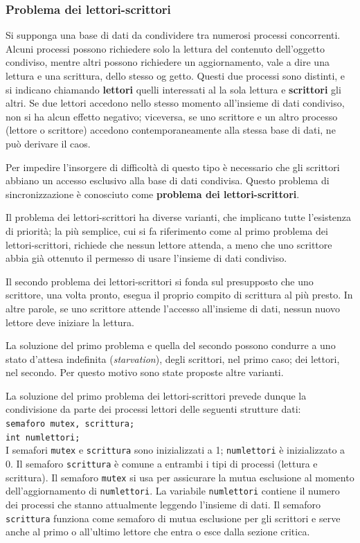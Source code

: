 \documentclass[11pt,a4paper]{article}
\begin{document}
\subsubsection{Problema dei lettori-scrittori}
Si supponga una base di dati da condividere tra numerosi processi concorrenti. Alcuni
processi possono richiedere solo la lettura del contenuto dell'oggetto condiviso, mentre altri
possono richiedere un aggiornamento, vale a dire una lettura e una scrittura, dello stesso og­
getto. Questi due processi sono distinti, e si indicano chiamando \textbf{lettori} quelli interessati al­
la sola lettura e \textbf{scrittori} gli altri. Se due lettori accedono nello stesso momento all'insieme di dati condiviso, non si ha alcun effetto negativo; viceversa, se uno scrit­tore e un altro processo (lettore o scrittore) accedono contemporaneamente alla stessa base
di dati, ne può derivare il caos.

Per impedire l'insorgere di difficoltà di questo tipo è necessario che gli scrittori abbia­no un accesso esclusivo alla base di dati condivisa. Questo problema di sincronizzazione è
conosciuto come \textbf{problema dei lettori-scrittori}.

Il problema dei
lettori-scrittori ha diverse varianti, che implicano tutte l'esistenza di priorità; la più sempli­ce, cui si fa riferimento come al primo problema dei lettori-scrittori, richiede che nessun let­tore attenda, a meno che uno scrittore abbia già ottenuto il permesso di usare l'insieme di
dati condiviso.

Il secondo problema dei lettori-scrittori si fonda sul presupposto che uno scrittore, una volta pronto, esegua il proprio com­pito di scrittura al più presto. In altre parole, se uno scrittore attende l'accesso all'insieme di
dati, nessun nuovo lettore deve iniziare la lettura.

La soluzione del primo problema e quella del secondo possono condurre a uno stato
d'attesa indefinita (\emph{starvation}), degli scrittori, nel primo caso; dei lettori, nel secondo. Per
questo motivo sono state proposte altre varianti.

La soluzione del primo problema dei lettori-scrittori prevede dunque la condivisione
da parte dei processi lettori delle seguenti strutture dati:\\
\texttt{semaforo mutex, scrittura;\\
        int numlettori;}\\
I semafori \texttt{mutex} e \texttt{scrittura} sono inizializzati a 1; \texttt{numlettori} è inizializzato a 0. Il
semaforo \texttt{scrittura} è comune a entrambi i tipi di processi (lettura e scrittura). Il semafo­ro \texttt{mutex} si usa per assicurare la mutua esclusione al momento dell'aggiornamento di
\texttt{numlettori}. La variabile \texttt{numlettori} contiene il numero dei processi che stanno attual­mente leggendo l'insieme di dati. Il semaforo \texttt{scrittura} funziona come semaforo di mutua esclusione per gli scrittori e serve anche al primo o all'ultimo lettore che entra o esce dal­la sezione critica.
\end{document}
